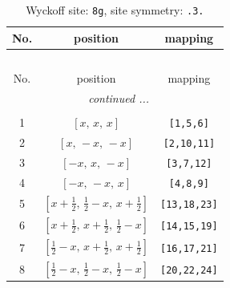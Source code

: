 \documentclass[fleqn,8pt]{jsarticle}
\begin{document}
\renewcommand{\arraystretch}{1.2}
\begin{longtable}{ccc}
\caption{Wyckoff site: {\tt 8g}, site symmetry: {\tt .3.}}
 \\
 \hline \hline
No. & position & mapping \\ \hline \endfirsthead

\multicolumn{2}{l}{\tablename\ \thetable{}} \\
 \hline \hline
No. & position & mapping \\ \hline \endhead

 \hline \hline
\multicolumn{2}{r}{\footnotesize\it continued ...} \\ \endfoot

 \hline \hline
\multicolumn{2}{r}{} \\ \endlastfoot

1 & $\left[ x,\, x,\, x \right]$ & {\tt [1,5,6]} \\ \hline
2 & $\left[ x,\, - x,\, - x \right]$ & {\tt [2,10,11]} \\ \hline
3 & $\left[ - x,\, x,\, - x \right]$ & {\tt [3,7,12]} \\ \hline
4 & $\left[ - x,\, - x,\, x \right]$ & {\tt [4,8,9]} \\ \hline
5 & $\left[ x + \frac{1}{2},\, \frac{1}{2} - x,\, x + \frac{1}{2} \right]$ & {\tt [13,18,23]} \\ \hline
6 & $\left[ x + \frac{1}{2},\, x + \frac{1}{2},\, \frac{1}{2} - x \right]$ & {\tt [14,15,19]} \\ \hline
7 & $\left[ \frac{1}{2} - x,\, x + \frac{1}{2},\, x + \frac{1}{2} \right]$ & {\tt [16,17,21]} \\ \hline
8 & $\left[ \frac{1}{2} - x,\, \frac{1}{2} - x,\, \frac{1}{2} - x \right]$ & {\tt [20,22,24]} \\
\end{longtable}
\renewcommand{\arraystretch}{1.2}
\end{document}
